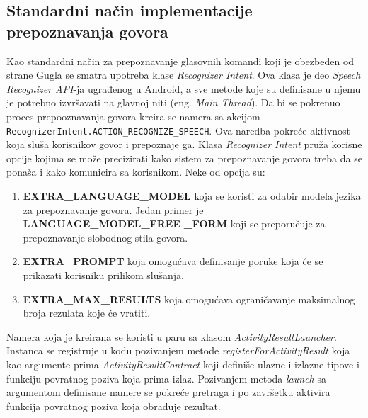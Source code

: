\documentclass[struktura.tex]{subfiles}
\begin{document}
\subsection{Standardni način implementacije prepoznavanja govora}
Kao standardni način za prepoznavanje glasovnih komandi koji je obezbeđen od strane Gugla se smatra upotreba klase \textit{Recognizer Intent}. Ova klasa je deo \textit{Speech Recognizer API}-ja ugrađenog u Android, a sve metode koje su definisane u njemu je potrebno izvršavati na glavnoj niti (eng. \textit{Main Thread}). Da bi se pokrenuo proces prepooznavanja govora kreira se namera sa akcijom \lstinline!RecognizerIntent.ACTION_RECOGNIZE_SPEECH!. Ova naredba pokreće aktivnost koja sluša korisnikov govor i prepoznaje ga. Klasa \textit{Recognizer Intent} pruža korisne opcije kojima se može precizirati kako sistem za prepoznavanje govora treba da se ponaša i kako komunicira sa korisnikom. Neke od opcija su:
\begin{enumerate}
    \item \textbf{EXTRA\_LANGUAGE\_MODEL} koja se koristi za odabir modela jezika za prepoznavanje govora. Jedan primer je \textbf{LANGUAGE\_MODEL\_FREE} \textbf{\_FORM} koji se preporučuje za prepoznavanje slobodnog stila govora.
    \item \textbf{EXTRA\_PROMPT} koja omogućava definisanje poruke koja će se prikazati korisniku prilikom slušanja.
    \item \textbf{EXTRA\_MAX\_RESULTS} koja omogućava ograničavanje maksimalnog broja rezulata koje će vratiti.
\end{enumerate}

Namera koja je kreirana se koristi u paru sa klasom \textit{ActivityResultLauncher}. Instanca se registruje u kodu pozivanjem metode \textit{registerForActivityResult} koja kao argumente prima \textit{ActivityResultContract} koji definiše ulazne i izlazne tipove i funkciju povratnog poziva koja prima izlaz. Pozivanjem metoda \textit{launch} sa argumentom definisane namere se pokreće pretraga i po završetku aktivira funkcija povratnog poziva koja obrađuje rezultat.
\end{document}
